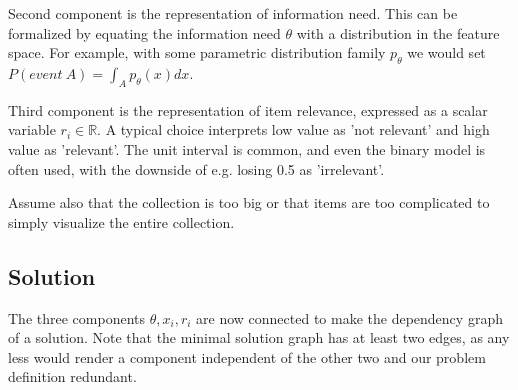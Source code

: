 \documentclass[10pt]{article}
\begin{document}
Second component is the representation of information need. This can be formalized by equating the information need $\theta$ with a distribution in the feature space. For example, with some parametric distribution family $p_\theta$ we would set $P(event\ A) = \int_A p_\theta (x) dx$.

Third component is the representation of item relevance, expressed as a scalar variable $r_i\in \mathbb R$. A typical choice interprets low value as 'not relevant' and high value as 'relevant'. The unit interval is common, and even the binary model is often used, with the downside of e.g. losing 0.5 as 'irrelevant'.

Assume also that the collection is too big or that items are too complicated to simply visualize the entire collection.

\subsection{Solution}
The three components $ \theta, x_i, r_i$ are now connected to make the dependency graph of a solution. Note that the minimal solution graph has at least two edges, as any less would render a component independent of the other two and our problem definition redundant.
\end{document}
